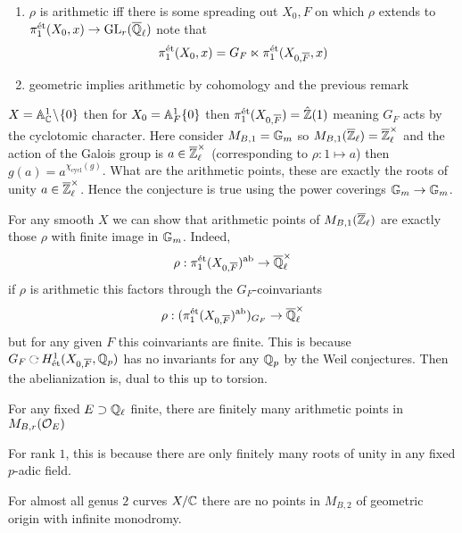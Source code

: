 \documentclass[12pt]{article}
\begin{document}
\begin{rmk}
\begin{enumerate}
\item $\rho$ is arithmetic iff there is some spreading out $X_0,F$ on which $\rho$ extends to $\pi_1^{\text{\'{e}t}}(X_0, x) \to \mathrm{GL}_r(\overline{\mathbb{Q}}_\ell)$ note that
\[ \pi_1^{\text{\'{e}t}}(X_0, x) = G_F \ltimes \pi_1^{\text{\'{e}t}}(X_{0,\overline{F}}, x) \]
\item geometric implies arithmetic by \etale cohomology and the previous remark
\end{enumerate}
\end{rmk}

\begin{example}
$X = \mathbb{A}^1_{\mathbb{C}} \! \setminus \! \{ 0 \}$ then for $X_0 = \mathbb{A}^1_F \{ 0 \}$ then $\pi_1^{\text{\'{e}t}}(X_{0, \overline{F}}) = \hat{\mathbb{Z}}(1)$ meaning $G_F$ acts by the cyclotomic character. Here consider $M_{B,1} = \mathbb{G}_m$ so $M_{B,1}(\overline{\mathbb{Z}}_{\ell}) = \overline{\mathbb{Z}}_{\ell}^\times$ and the action of the Galois group is $a \in \overline{\mathbb{Z}}_{\ell}^\times$ (corresponding to $\rho : 1 \mapsto a$) then $g(a) = a^{\chi_{\text{cycl}}(g)}$. What are the arithmetic points, these are exactly the roots of unity $a \in \overline{\mathbb{Z}}_{\ell}^\times$. Hence the conjecture is true using the power coverings $\mathbb{G}_m \to \mathbb{G}_m$.  
\end{example}

\begin{rmk}
For any smooth $X$ we can show that arithmetic points of $M_{B,1}(\overline{\mathbb{Z}}_\ell)$ are exactly those $\rho$ with finite image in $\mathbb{G}_m$. Indeed,
\[ \rho : \pi_1^{\text{\'{e}t}}(X_{0,\overline{F}})^{\mathrm{ab}} \to \overline{\mathbb{Q}}_{\ell}^\times \]
if $\rho$ is arithmetic this factors through the $G_F$-coinvariants 
\[ \rho : (\pi_1^{\text{\'{e}t}}(X_{0,\overline{F}})^{\mathrm{ab}})_{G_F} \to \overline{\mathbb{Q}}_\ell^\times \]
but for any given $F$ this coinvariants are finite. This is because $G_F \acts H^1_{\et}(X_{0,\ol{F}}, \Q_p)$ has no invariants for any $\mathbb{Q}_p$ by the Weil conjectures. Then the abelianization is, dual to this up to torsion. 
\end{rmk}

\begin{theorem}[Litt]
For any fixed $E \supset \mathbb{Q}_\ell$ finite, there are finitely many arithmetic points in $M_{B,r}(\mathcal{O}_{E})$ 
\end{theorem}

\begin{rmk}
For rank $1$, this is because there are only finitely many roots of unity in any fixed $p$-adic field. 
\end{rmk}

\begin{theorem}
For almost all genus $2$ curves $X / \mathbb{C}$ there are no points in $M_{B,2}$ of geometric origin with infinite monodromy. 
\end{theorem}
\end{document}
